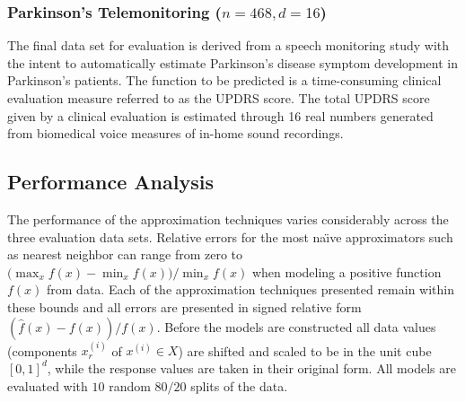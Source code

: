 \documentclass[smallextended]{svjour3}       %
\begin{document}
\subsubsection{Parkinson's Telemonitoring ($n = 468, d = 16$)}
The final data set for evaluation \cite{tsanas2010accurate} is derived from a speech monitoring study with the intent to automatically estimate Parkinson's disease symptom development in Parkinson's patients. The function to be predicted is a time-consuming clinical evaluation measure referred to as the UPDRS score. The total UPDRS score given by a clinical evaluation is estimated through 16 real numbers generated from biomedical voice measures of in-home sound recordings.

\subsection{Performance Analysis}
\label{sec_performance_analysis}

The performance of the approximation techniques varies considerably across the three evaluation data sets. Relative errors for the most na\"{\i}ve approximators such as nearest neighbor can range from zero to $\displaystyle \big(\max_x f(x) - \min_x f(x)\big) / \min_x f(x)$ when modeling a positive function $f(x)$ from data. Each of the approximation techniques presented remain within these bounds and all errors are presented in signed relative form $(\hat f(x) - f(x)) / f(x)$. Before the models are constructed all data values (components $x^{(i)}_r$ of $x^{(i)} \in X$) are shifted and scaled to be in the unit cube $[0,1]^d$, while the response values are taken in their original form. All models are evaluated with $10$ random $80/20$ splits of the data.
\end{document}
